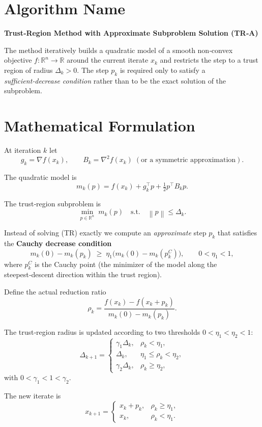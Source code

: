 \documentclass{article}
\newcommand{\norm}[1]{\left\lVert#1\right\rVert}
\newcommand{\R}{\mathbb{R}}
\begin{document}
\section*{Algorithm Name}
\textbf{Trust‑Region Method with Approximate Subproblem Solution (TR‑A)}  

The method iteratively builds a quadratic model of a smooth non‑convex objective
\(f:\R^{n}\rightarrow\R\) around the current iterate \(x_{k}\) and restricts the
step to a trust region of radius \(\Delta_{k}>0\).  The step \(p_{k}\) is required
only to satisfy a \emph{sufficient‑decrease condition} rather than to be the exact
solution of the subproblem.

\section*{Mathematical Formulation}
At iteration \(k\) let
\[
g_{k}= \nabla f(x_{k}),\qquad 
B_{k}= \nabla^{2}f(x_{k})\;( \text{or a symmetric approximation} ).
\]

The quadratic model is
\[
m_{k}(p)=f(x_{k})+g_{k}^{\top}p+\tfrac12 p^{\top}B_{k}p .
\]

The trust‑region subproblem is
\[
\min_{p\in\R^{n}}\; m_{k}(p)\quad\text{s.t.}\quad \norm{p}\le \Delta_{k}. \tag{TR}
\]

Instead of solving (TR) exactly we compute an \emph{approximate} step
\(p_{k}\) that satisfies the \textbf{Cauchy decrease condition}
\[
m_{k}(0)-m_{k}(p_{k})\;\ge\;\eta_{1}\bigl(m_{k}(0)-m_{k}(p_{k}^{C})\bigr),\qquad
0<\eta_{1}<1,
\tag{1}
\]
where \(p_{k}^{C}\) is the Cauchy point (the minimizer of the model along the
steepest‑descent direction within the trust region).

Define the actual reduction ratio
\[
\rho_{k}= \frac{f(x_{k})-f(x_{k}+p_{k})}{m_{k}(0)-m_{k}(p_{k})}.
\tag{2}
\]

The trust‑region radius is updated according to two thresholds
\(0<\eta_{1}<\eta_{2}<1\):
\[
\Delta_{k+1}=
\begin{cases}
\gamma_{1}\Delta_{k}, & \rho_{k}<\eta_{1},\\[4pt]
\Delta_{k},           & \eta_{1}\le\rho_{k}<\eta_{2},\\[4pt]
\gamma_{2}\Delta_{k}, & \rho_{k}\ge\eta_{2},
\end{cases}
\tag{3}
\]
with \(0<\gamma_{1}<1<\gamma_{2}\).

The new iterate is
\[
x_{k+1}= 
\begin{cases}
x_{k}+p_{k}, & \rho_{k}\ge \eta_{1},\\
x_{k},       & \rho_{k}<\eta_{1}.
\end{cases}
\tag{4}
\]
\end{document}
